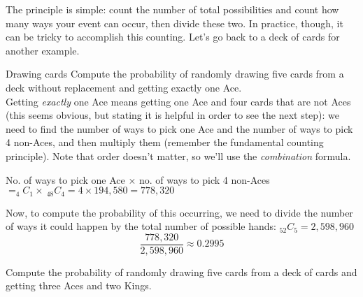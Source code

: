 The principle is simple: count the number of total possibilities and count how many ways your event can occur, then divide these two.  In practice, though, it can be tricky to accomplish this counting.  Let's go back to a deck of cards for another example.

\begin{example}[https://www.youtube.com/watch?v=QXyNszl3_h0]{Drawing cards}
Compute the probability of randomly drawing five cards from a deck without replacement and getting exactly one Ace.\\

Getting \textit{exactly} one Ace means getting one Ace and four cards that are not Aces (this seems obvious, but stating it is helpful in order to see the next step): we need to find the number of ways to pick one Ace and the number of ways to pick 4 non-Aces, and then multiply them (remember the fundamental counting principle).  Note that order doesn't matter, so we'll use the \textit{combination} formula.
\begin{center}
No. of ways to pick one Ace $\times$ no. of ways to pick 4 non-Aces\\
$= _4C_1 \times \ _{48}C_4 = 4 \times 194,580 = 778,320$
\end{center}

Now, to compute the probability of this occurring, we need to divide the number of ways it could happen by the total number of possible hands: $_{52}C_5 = 2,598,960$
\[\dfrac{778,320}{2,598,960} \approx 0.2995\]
\end{example}


\begin{try}
Compute the probability of randomly drawing five cards from a deck of cards and getting three Aces and two Kings.
\end{try}
\vfill
\pagebreak

